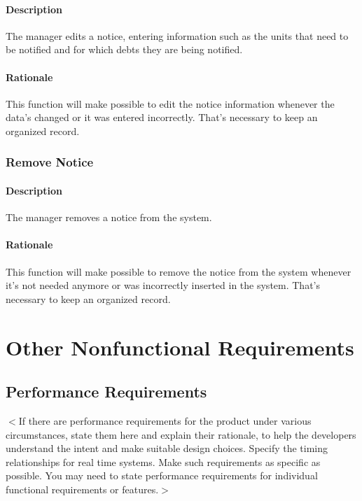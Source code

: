 \documentclass{scrreprt}
\begin{document}
\subsubsection{Description}

The manager edits a notice, entering information such as the units that need to be notified and for which debts they are being notified.

\subsubsection{Rationale}

This function will make possible to edit the notice information whenever the data's changed or it was entered incorrectly. That's necessary to keep an organized record.

\subsection{Remove Notice}
\subsubsection{Description}

The manager removes a notice from the system.

\subsubsection{Rationale}

This function will make possible to remove the notice from the system whenever it's not needed anymore or was incorrectly inserted in the system. That's necessary to keep an organized record.

\chapter{Other Nonfunctional Requirements}

\section{Performance Requirements}
$<$If there are performance requirements for the product under various
circumstances, state them here and explain their rationale, to help the
developers understand the intent and make suitable design choices. Specify the
timing relationships for real time systems. Make such requirements as specific
as possible. You may need to state performance requirements for individual
functional requirements or features.$>$
\end{document}

